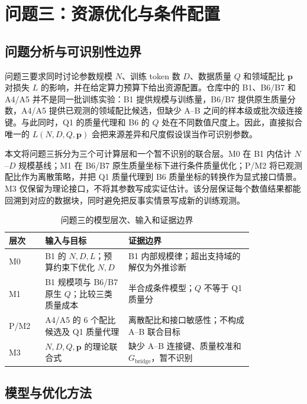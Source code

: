 \section{问题三：资源优化与条件配置}
\label{sec:q3}

\subsection{问题分析与可识别性边界}

问题三要求同时讨论参数规模 $N$、训练 token 数 $D$、数据质量 $Q$ 和领域配比 $\boldsymbol p$ 对损失 $L$ 的影响，并在给定算力预算下给出资源配置。仓库中的 B1、B6/B7 和 A4/A5 并不是同一批训练实验：B1 提供规模与训练量，B6/B7 提供原生质量分数，A4/A5 提供已观测的领域配比候选，但缺少 A--B 之间的样本级或批次级连接键。与此同时，Q1 的质量代理和 B6 的 $Q$ 处在不同数值尺度上。因此，直接拟合唯一的 $L(N,D,Q,\boldsymbol p)$ 会把来源差异和尺度假设误当作可识别参数。

本文将问题三拆分为三个可计算层和一个暂不识别的联合层。M0 在 B1 内估计 $N$--$D$ 规模基线；M1 在 B6/B7 原生质量坐标下进行条件质量优化；P/M2 将已观测配比作为离散策略，并把 Q1 质量代理到 B6 质量坐标的转换作为显式接口情景。M3 仅保留为理论接口，不将其参数写成实证估计。该分层保证每个数值结果都能回溯到对应的数据块，同时避免把反事实情景写成新的训练观测。

\begin{table}[htbp]
\centering
\caption{问题三的模型层次、输入和证据边界}
\label{tab:q3-model-layers}
\renewcommand{\arraystretch}{1.15}
\begin{tabular}{p{0.12\linewidth}p{0.28\linewidth}p{0.42\linewidth}}
\toprule
层次 & 输入与目标 & 证据边界 \\
\midrule
M0 & B1 的 $N,D,L$；预算约束下优化 $N,D$ & B1 内部规模律；超出支持域的解仅为外推诊断 \\
M1 & B1 规模项与 B6/B7 原生 $Q$；比较三类质量成本 & 半合成条件模型；$Q$ 不等于 Q1 质量分 \\
P/M2 & A4/A5 的 6 个配比候选及 Q1 质量代理 & 离散配比和接口敏感性；不构成 A--B 联合目标 \\
M3 & $N,D,Q,\boldsymbol p$ 的理论联合式 & 缺少 A--B 连接键、质量校准和 $G_{\mathrm{bridge}}$，暂不识别 \\
\bottomrule
\end{tabular}
\end{table}

\subsection{模型与优化方法}

